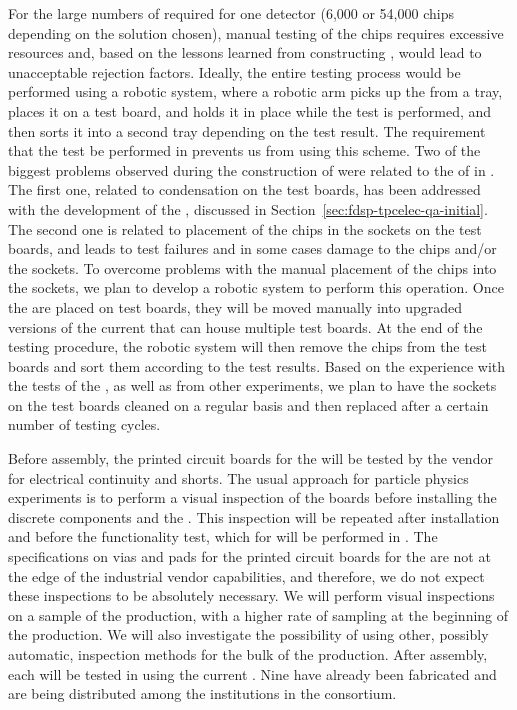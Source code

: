 For the large numbers of
 required for one   detector
(6,000 or 54,000 chips depending on the  solution
chosen), manual testing of the chips requires excessive 
resources and, based on the lessons learned from  
constructing  , would lead to unacceptable rejection
factors. Ideally, the entire testing
process would be performed using a robotic system, where 
a robotic arm picks up the  from a tray, places
it on a test board, and holds it in place while the test
is performed, and then sorts it into a second tray
depending on the test result. The requirement that the test
be performed in \lntwo prevents us from using this
scheme. Two of the biggest problems observed during the
construction of  were related to the 
of  in \lntwo. The first one, related to
condensation on the test boards, has been addressed with
the development of the , discussed in Section~\ref{sec:fdsp-tpcelec-qa-initial}.
The second one is related to placement of the chips in the
sockets on the test boards, and leads to test failures
and in some cases damage to the chips and/or the sockets.
To overcome problems with the manual placement of the chips into
the sockets, we plan to develop a robotic system
to perform this operation. Once the  are 
placed on test boards, they will be moved manually into 
upgraded versions of the current  that can
house multiple test boards. At the end of the testing
procedure, the robotic system will then remove
the chips from the test boards and sort them according to
the test results. Based on the experience with the tests of
the  , as well as from other experiments,
we plan to have the sockets on the test boards cleaned on a regular 
basis and then replaced after a certain number of
testing cycles. 

Before assembly, the printed circuit boards for the
 will be tested by the vendor for electrical
continuity and shorts. The usual approach for particle physics
experiments is to perform a visual inspection of the boards
before installing the discrete components and 
the . This inspection will be repeated after 
installation and before the functionality test, which for  will
be performed in \lntwo. The specifications on vias and pads for the printed
circuit boards for the  are not at the edge of the
industrial vendor capabilities, and therefore, we do not
expect these inspections to be absolutely necessary. We will
perform visual inspections on a sample of the 
production, with a higher rate of sampling at the beginning
of the production. We will also investigate the possibility
of using other, possibly automatic, inspection methods for
the bulk of the production. After assembly, 
each  will be tested in \lntwo using
the current . Nine  have already been
fabricated and are being distributed among the institutions
in the consortium. 

